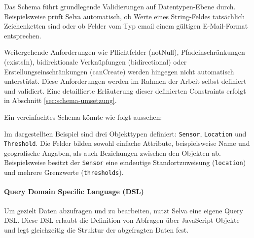 Das Schema führt grundlegende Validierungen auf Datentypen-Ebene durch. Beispielsweise prüft Selva automatisch, ob Werte eines String-Feldes tatsächlich Zeichenketten sind oder ob Felder vom Typ email einem gültigen E-Mail-Format entsprechen.

Weitergehende Anforderungen wie Pflichtfelder (notNull), Pfadeinschränkungen (existsIn), bidirektionale Verknüpfungen (bidirectional) oder Erstellungseinschränkungen (canCreate) werden hingegen nicht automatisch unterstützt. Diese Anforderungen werden im Rahmen der Arbeit selbst definiert und validiert. Eine detaillierte Erläuterung dieser definierten Constraints erfolgt in Abschnitt \ref{sec:schema-umsetzung}.

\pagebreak

Ein vereinfachtes Schema könnte wie folgt aussehen:





Im dargestellten Beispiel sind drei Objekttypen definiert: \texttt{Sensor}, \texttt{Location} und \texttt{Threshold}. Die Felder bilden sowohl einfache Attribute, beispielsweise Name und geografische Angaben, als auch Beziehungen zwischen den Objekten ab. Beispielsweise besitzt der \texttt{Sensor} eine eindeutige Standortzuweisung (\texttt{location}) und mehrere Grenzwerte (\texttt{thresholds}). 


\paragraph{Query Domain Specific Language (DSL)}
Um gezielt Daten abzufragen und zu bearbeiten, nutzt Selva eine eigene Query DSL. Diese DSL erlaubt die Definition von Abfragen über JavaScript-Objekte und legt gleichzeitig die Struktur der abgefragten Daten fest.

